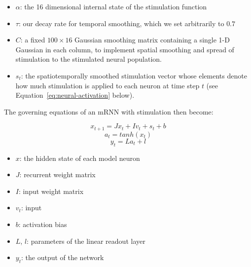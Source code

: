 \documentclass[12pt]{iopart}
\begin{document}
\begin{itemize}
	\item $\alpha$: the 16 dimensional internal state 
        of the stimulation function
	\item $\tau$: our decay rate for temporal smoothing, which we set arbitrarily to $0.7$
	\item $C$: a fixed $100 \times 16$ Gaussian smoothing matrix containing a single 1-D Gaussian
	           in each column, to implement spatial smoothing and spread of stimulation to the
	           stimulated neural population. 
	\item $s_{t}$: the spatiotemporally smoothed stimulation vector whose elements denote how
	               much stimulation is applied to each neuron at time step $t$ (see
	               Equation~\ref{eq:neural-activation} below).
\end{itemize}

\noindent The governing equations of an mRNN with stimulation then become:

\begin{equation}
x_{t+1} = Jx_{t} + Iv_{t} + s_{t} + b
\label{eq:neural-activation}
\end{equation}
\begin{equation}
a_{t} = tanh(x_{t})
\end{equation}
\begin{equation}
y_{t} = La_{t} + l
\end{equation}

\begin{itemize}
	\item $x$: the hidden state of each model neuron
	\item $J$: recurrent weight matrix
	\item $I$: input weight matrix
    \item $v_{t}$: input 
	\item $b$: activation bias
	\item $L$, $l$: parameters of the linear readout layer
	\item $y_{t}$: the output of the network
\end{itemize}
\end{document}
